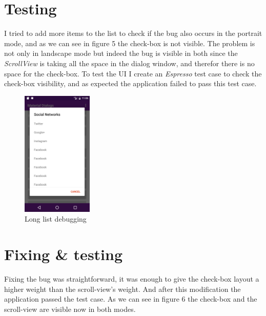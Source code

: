 \documentclass[12pt]{report}
\begin{document}
\newpage

\section*{Testing}
I tried to add more items to the list to check if the bug also occurs in the portrait mode, and as we can see in figure 5 the check-box is not visible. The problem is not only in landscape mode but indeed the bug is visible in both since the \emph{ScrollView} is taking all the space in the dialog window, and therefor there is no space for the check-box.
To test the UI I create an \emph{Espresso} test case to check the check-box visibility, and as expected the application failed to pass this test case.

\begin{figure}[H]
	\centering
	\includegraphics[width=0.3\textwidth,height=0.4\textheight]{screenshots/longlist.png}
	\caption{Long list debugging}
\end{figure}

\newpage
\section*{Fixing \& testing} 
Fixing the bug was straightforward, it was enough to give the check-box layout a higher weight than the scroll-view's weight. And after this modification the application passed the test case. As we can see in figure 6 the check-box and the scroll-view are visible now in both modes.
\end{document}

